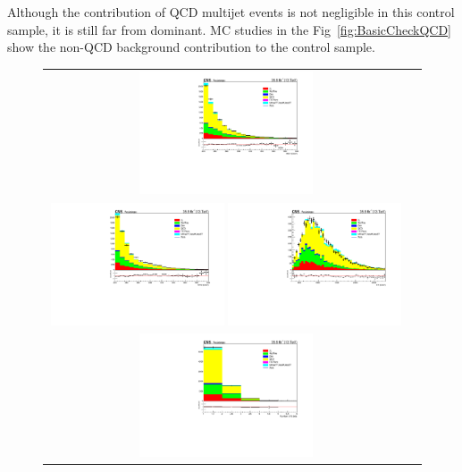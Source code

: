 Although the contribution of QCD multijet events is not negligible in this 
control sample, it is still far from dominant.
MC studies in the Fig~\ref{fig:BasicCheckQCD} show the non-QCD background contribution to the 
control sample.
\begin{figure}[hp]
\begin{center}
\begin{tabular}{cc}
\includegraphics[width=0.49\textwidth]{sections/mc4/Backgrounds/QCD/figures/84sb/_met_BasicCheck.pdf}\\
\includegraphics[width=0.49\textwidth]{sections/mc4/Backgrounds/QCD/figures/84sb/_mt2_BasicCheck.pdf}
\includegraphics[width=0.49\textwidth]{sections/mc4/Backgrounds/QCD/figures/84sb/_ht_BasicCheck.pdf}\\
\includegraphics[width=0.49\textwidth]{sections/mc4/Backgrounds/QCD/figures/84sb/_nbjets_BasicCheck.pdf}

\end{tabular}
\end{center}
\end{figure}
